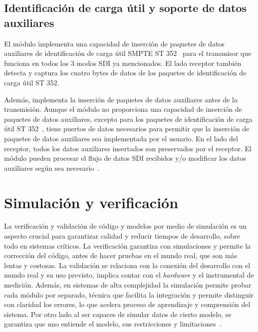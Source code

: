   \subsection{Identificación de carga útil y soporte de datos auxiliares}

  El módulo implementa una capacidad de inserción de paquetes de datos auxiliares
  de identificación de carga útil SMPTE ST 352~\citep{st352} para el transmisor que funciona en
  todos los 3 modos SDI ya mencionados. El lado receptor también detecta y captura
  los cuatro bytes de datos de los paquetes de identificación de carga útil ST 352.

  Además, implementa la inserción de paquetes de datos auxiliares antes de la
  transmisión. Aunque el módulo no proporciona una capacidad de inserción de paquetes
  de datos auxiliares, excepto para los paquetes de identificación de carga útil
  ST 352~\citep{st352}, tiene puertos de datos necesarios para permitir que la inserción de
  paquetes de datos auxiliares sea implementada por el usuario. En el lado del
  receptor, todos los datos auxiliares insertados son preservados por el receptor.
  El módulo pueden procesar el flujo de datos SDI recibidos y/o modificar los datos
  auxiliares según sea necesario~\citep{design}.

\section{Simulación y verificación}

  La verificación y validación de código y modelos por medio de simulación es
  un aspecto crucial para garantizar calidad y reducir tiempos de desarrollo,
  sobre todo en sistemas críticos. La verificación garantiza con simulaciones y
  permite la corrección del código, antes de hacer pruebas en el mundo real, que
  son más lentas y costosas. La validación se relaciona con la conexión del
  desarrollo con el mundo real y su uso previsto, implica contar con el
  \textit{hardware} y el instrumental de medición. Además, en sistemas de alta
  complejidad la simulación permite probar cada módulo por separado, técnica que
  facilita la integración y permite distinguir con claridad los errores, lo que
  acelera proceso de aprendizaje y comprensión del sistema. Por otro lado al ser
  capaces de simular datos de cierto modelo, se garantiza que uno entiende el
  modelo, sus restricciones y limitaciones~\citep{testbench}.

